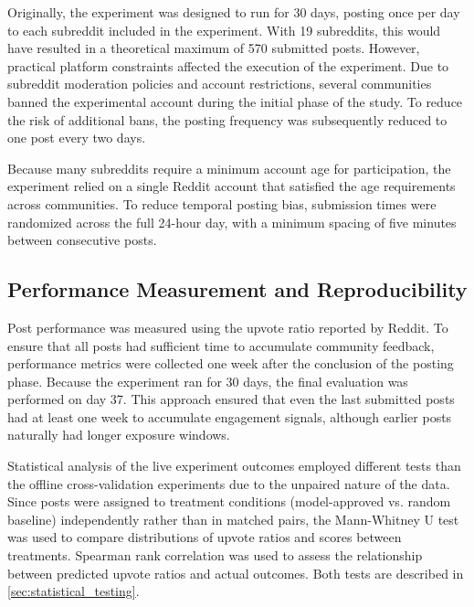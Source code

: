Originally, the experiment was designed to run for 30 days, posting once per day to each subreddit included in the experiment. With 19 subreddits, this would have resulted in a theoretical maximum of 570 submitted posts.
However, practical platform constraints affected the execution of the experiment. Due to subreddit moderation policies and account restrictions, several communities banned the experimental account during the initial phase of the study. 
To reduce the risk of additional bans, the posting frequency was subsequently reduced to one post every two days.

Because many subreddits require a minimum account age for participation, the experiment relied on a single Reddit account that satisfied the age requirements across communities.
To reduce temporal posting bias, submission times were randomized across the full 24-hour day, with a minimum spacing of five minutes between consecutive posts.

\subsection{Performance Measurement and Reproducibility}

Post performance was measured using the upvote ratio reported by Reddit. To ensure that all posts had sufficient time to accumulate community feedback, performance metrics were collected one week after the conclusion of the posting phase.
Because the experiment ran for 30 days, the final evaluation was performed on day 37. 
This approach ensured that even the last submitted posts had at least one week to accumulate engagement signals, although earlier posts naturally had longer exposure windows. 

Statistical analysis of the live experiment outcomes employed different tests than the offline cross-validation experiments due to the unpaired nature of the data. 
Since posts were assigned to treatment conditions (model-approved vs. random baseline) independently rather than in matched pairs, the Mann-Whitney U test was used to compare distributions of upvote ratios and scores between treatments. 
Spearman rank correlation was used to assess the relationship between predicted upvote ratios and actual outcomes. 
Both tests are described in \autoref{sec:statistical_testing}.

